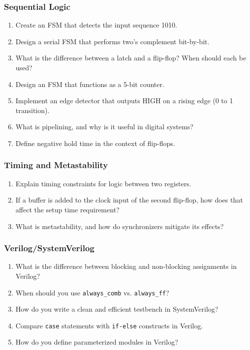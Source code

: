 \subsubsection*{Sequential Logic}
\begin{enumerate}
    \item Create an FSM that detects the input sequence 1010.
    \item Design a serial FSM that performs two’s complement bit-by-bit.
    \item What is the difference between a latch and a flip-flop? When should each be used?
    \item Design an FSM that functions as a 5-bit counter.
    \item Implement an edge detector that outputs HIGH on a rising edge (0 to 1 transition).
    \item What is pipelining, and why is it useful in digital systems?
    \item Define negative hold time in the context of flip-flops.
\end{enumerate}

\subsubsection*{Timing and Metastability}
\begin{enumerate}
    \item Explain timing constraints for logic between two registers.
    \item If a buffer is added to the clock input of the second flip-flop, how does that affect the setup time requirement?
    \item What is metastability, and how do synchronizers mitigate its effects?
\end{enumerate}

\subsubsection*{Verilog/SystemVerilog}
\begin{enumerate}
    \item What is the difference between blocking and non-blocking assignments in Verilog?
    \item When should you use \texttt{always\_comb} vs. \texttt{always\_ff}?
    \item How do you write a clean and efficient testbench in SystemVerilog?
    \item Compare \texttt{case} statements with \texttt{if-else} constructs in Verilog.
    \item How do you define parameterized modules in Verilog?
\end{enumerate}

